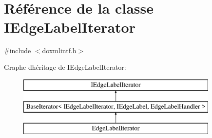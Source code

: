 \hypertarget{class_i_edge_label_iterator}{}\section{Référence de la classe I\+Edge\+Label\+Iterator}
\label{class_i_edge_label_iterator}


{\ttfamily \#include $<$doxmlintf.\+h$>$}

Graphe d\textquotesingle{}héritage de I\+Edge\+Label\+Iterator\+:\begin{figure}[H]
\begin{center}
\leavevmode
\includegraphics[height=3.000000cm]{class_i_edge_label_iterator}
\end{center}
\end{figure}
